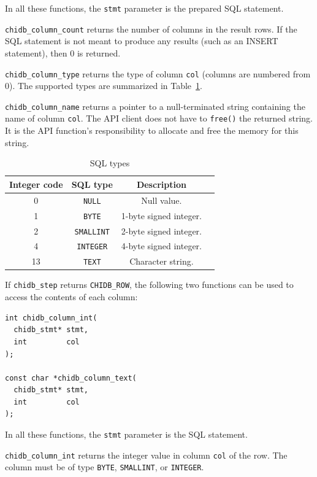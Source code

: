 \documentclass[10pt]{article}
\begin{document}
In all these functions, the \texttt{stmt} parameter is the prepared SQL statement.

\verb+chidb_column_count+ returns the number of columns in the result rows. If the SQL statement is not meant to produce any results (such as an INSERT statement), then 0 is returned.

\verb+chidb_column_type+ returns the type of column \texttt{col} (columns are numbered from 0). The supported types are summarized in Table~\ref{tab:sqltypes}.

\verb+chidb_column_name+ returns a pointer to a null-terminated string containing the name of column \texttt{col}. The API client does not have to \texttt{free()} the returned string. It is the API function's responsibility to allocate and free the memory for this string. 

\begin{table}
\caption{SQL types}
\begin{center}
\sffamily
\begin{tabular}{|c|c|c|p{7cm}|}
\hline \textbf{Integer code} & \textbf{SQL type} & \textbf{Description} \\ \hline\hline
0 & \texttt{NULL} & Null value.  \\ \hline
1 & \texttt{BYTE} & 1-byte signed integer. \\ \hline
2 & \texttt{SMALLINT} & 2-byte signed integer. \\ \hline
4 & \texttt{INTEGER} & 4-byte signed integer. \\ \hline
13 & \texttt{TEXT} & Character string. \\ \hline
\end{tabular}
\end{center}
\label{tab:sqltypes}
\end{table}

If \verb+chidb_step+ returns \verb+CHIDB_ROW+, the following two functions can be used to access the contents of each column:

\begin{verbatim}
int chidb_column_int(
  chidb_stmt* stmt, 
  int         col
);

const char *chidb_column_text(
  chidb_stmt* stmt, 
  int         col
);
\end{verbatim}

In all these functions, the \texttt{stmt} parameter is the SQL statement.

\verb+chidb_column_int+ returns the integer value in column \texttt{col} of the row. The column must be of type \texttt{BYTE}, \texttt{SMALLINT}, or \texttt{INTEGER}.
\end{document}
